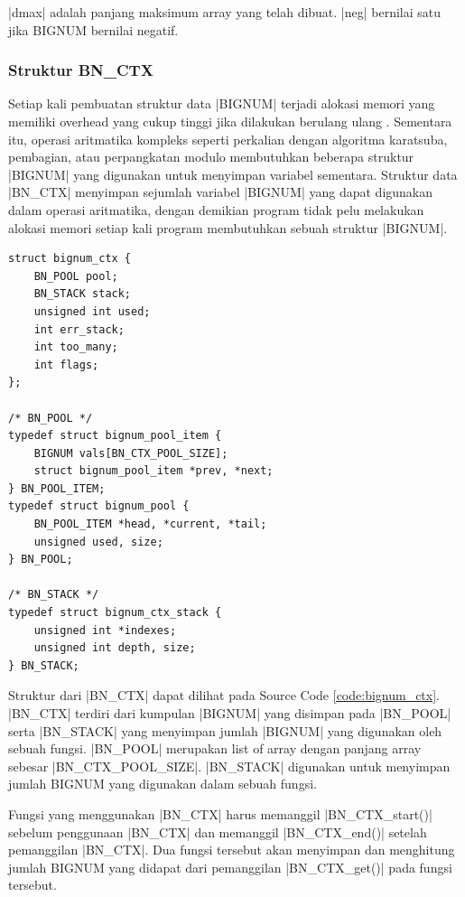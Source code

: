     |dmax| adalah panjang maksimum array yang telah dibuat. |neg| bernilai satu jika BIGNUM bernilai negatif.

    \subsubsection{Struktur BN\_CTX}

    Setiap kali pembuatan struktur data |BIGNUM| terjadi alokasi memori yang memiliki overhead yang cukup tinggi jika dilakukan berulang ulang \citep{doc_bnctx}. Sementara itu, operasi aritmatika kompleks seperti perkalian dengan algoritma karatsuba, pembagian, atau perpangkatan modulo membutuhkan beberapa struktur |BIGNUM| yang digunakan untuk menyimpan variabel sementara. Struktur data |BN_CTX| menyimpan sejumlah variabel |BIGNUM| yang dapat digunakan dalam operasi aritmatika, dengan demikian program tidak pelu melakukan alokasi memori setiap kali program membutuhkan sebuah struktur |BIGNUM|.


    \begin{lstlisting}[caption={Struktur bignum\_ctx},captionpos=b, label={code:bignum_ctx}]
struct bignum_ctx {
    BN_POOL pool;
    BN_STACK stack;
    unsigned int used;
    int err_stack;
    int too_many;
    int flags;
};

/* BN_POOL */
typedef struct bignum_pool_item {
    BIGNUM vals[BN_CTX_POOL_SIZE];
    struct bignum_pool_item *prev, *next;
} BN_POOL_ITEM;
typedef struct bignum_pool {
    BN_POOL_ITEM *head, *current, *tail;
    unsigned used, size;
} BN_POOL;

/* BN_STACK */
typedef struct bignum_ctx_stack {
    unsigned int *indexes;
    unsigned int depth, size;
} BN_STACK;
    \end{lstlisting}

    Struktur dari |BN_CTX| dapat dilihat pada Source Code \ref{code:bignum_ctx}. |BN_CTX| terdiri dari kumpulan |BIGNUM| yang disimpan pada |BN_POOL| serta |BN_STACK| yang menyimpan jumlah |BIGNUM| yang digunakan oleh sebuah fungsi. |BN_POOL| merupakan list of array dengan panjang array sebesar |BN_CTX_POOL_SIZE|. |BN_STACK| digunakan untuk menyimpan jumlah BIGNUM yang digunakan dalam sebuah fungsi.

    Fungsi yang menggunakan |BN_CTX| harus memanggil |BN_CTX_start()| sebelum penggunaan |BN_CTX| dan memanggil |BN_CTX_end()| setelah pemanggilan |BN_CTX|. Dua fungsi tersebut akan menyimpan dan menghitung jumlah BIGNUM yang didapat dari pemanggilan |BN_CTX_get()| pada fungsi tersebut.

